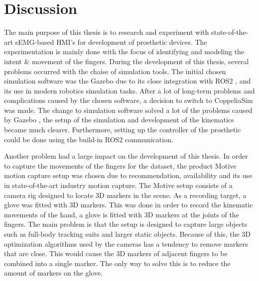 \documentclass[../main.tex]{subfiles}
\begin{document}
\section{Discussion}

The main purpose of this thesis is to research and experiment with state-of-the-art \gls{sEMG}-based \gls{HMI}'s for development of prosthetic devices.
The experimentation is mainly done with the focus of identifying and modeling the intent \& movement of the fingers.
During the development of this thesis, several problems occurred with the chaise of simulation tools.
The initial chosen simulation software was the Gazebo \cite{gazebo} due to its close integration with ROS2 \cite{ros2}, and its use in modern robotics simulation tasks.
After a lot of long-term problems and complications caused by the chosen software, a decision to switch to CoppeliaSim \cite{coppeliasim} was made.
The change to simulation software solved a lot of the problems caused by Gazebo \cite{gazebo}, the setup of the simulation and development of the kinematics became much clearer.
Furthermore, setting up the controller of the prosthetic could be done using the build-in ROS2 \cite{ros2} communication.

Another problem had a large impact on the development of this thesis.
In order to capture the movements of the fingers for the dataset, the product Motive motion capture setup \cite{motive} was chosen due to recommendation, availability and its use in state-of-the-art industry motion capture.
The Motive setup consists of a camera rig designed to locate 3D markers in the scene.
As a recording target, a glove was fitted with 3D markers.
This was done in order to record the kinematic movements of the hand, a glove is fitted with 3D markers at the joints of the fingers.
The main problem is that the setup is designed to capture large objects such as full-body tracking suits and larger static objects.
Because of this, the 3D optimization algorithms used by the cameras has a tendency to remove markers that are close. 
This would cause the 3D markers of adjacent fingers to be combined into a single marker.
The only way to solve this is to reduce the amount of markers on the glove.
\end{document}
